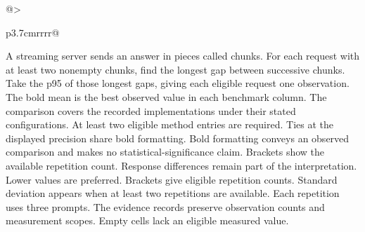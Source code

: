 \begin{table}[!htp]
\begin{tabular}{@{}>{\raggedright\arraybackslash}p{3.7cm}rrrr@{}}
\bottomrule
\end{tabular}\par\medskip
\begin{minipage}{\linewidth}\footnotesize
A streaming server sends an answer in pieces called chunks. For each request with at least two nonempty chunks, find the longest gap between successive chunks. Take the p95 of those longest gaps, giving each eligible request one observation.
The bold mean is the best observed value in each benchmark column. The comparison covers the recorded implementations under their stated configurations. At least two eligible method entries are required. Ties at the displayed precision share bold formatting. Bold formatting conveys an observed comparison and makes no statistical-significance claim. Brackets show the available repetition count. Response differences remain part of the interpretation. Lower values are preferred.
Brackets give eligible repetition counts. Standard deviation appears when at least two repetitions are available. Each repetition uses three prompts. The evidence records preserve observation counts and measurement scopes. Empty cells lack an eligible measured value.
\end{minipage}
\end{table}

